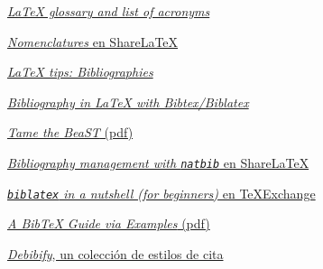 \href{http://texblog.org/2014/01/15/glossary-and-list-of-acronyms-with-latex/}{\emph{LaTeX
glossary and list of acronyms}}

\href{https://www.sharelatex.com/learn/Nomenclatures}{\emph{Nomenclatures}
en ShareLaTeX}

\href{http://www.math.illinois.edu/~ajh/tex/bibliographies.html}{\emph{LaTeX
tips: Bibliographies}}

\href{https://www.latex-tutorial.com/tutorials/beginners/latex-bibtex/}{\emph{Bibliography
in LaTeX with Bibtex/Biblatex}}

\href{ftp://ftp.dante.de/tex-archive/info/bibtex/tamethebeast/ttb_en.pdf}{\emph{Tame
the BeaST} (pdf)}

\href{https://www.sharelatex.com/learn/Bibliography_management_with_natbib}{\emph{Bibliography
management with \lstinline!natbib!} en ShareLaTeX}

\href{http://tex.stackexchange.com/questions/13509/biblatex-in-a-nutshell-for-beginners}{\emph{\lstinline!biblatex!
in a nutshell (for beginners)} en TeXExchange}

\href{http://www.colorado.edu/physics/phys4610/phys4610_sp13/bibtex_guide.pdf}{\emph{A
BibTeX Guide via Examples} (pdf)}

\href{http://debibify.dorian-depriester.fr/}{\emph{Debibify}, un
colección de estilos de cita}

